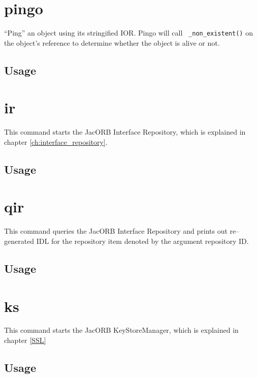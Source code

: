 \documentclass[12pt]{scrbook}
\begin{document}
\section{pingo}

``Ping'' an object using its stringified IOR. Pingo will call {\tt
  \_non\_existent()} on the object's reference to determine whether
  the object is alive or not.

\subsection*{Usage}


\section{ir}

This command starts the JacORB Interface Repository, which is explained in
chapter \ref{ch:interface_repository}.

\subsection*{Usage}


\section{qir}

This command queries the JacORB Interface Repository and prints out
re--generated IDL for the repository item denoted by the argument
repository ID.

\subsection*{Usage}


\section{ks}

This command starts the JacORB KeyStoreManager, which is explained in
chapter \ref{SSL}

\subsection*{Usage}
\end{document}
